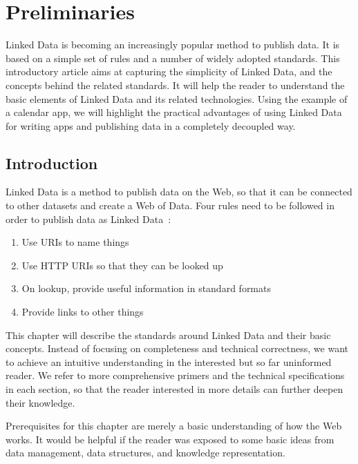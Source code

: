 \chapter{Preliminaries}

Linked Data is becoming an increasingly popular method to publish data.
It is based on a simple set of rules and a number of widely adopted standards.
This introductory article aims at capturing the simplicity of Linked Data, and the concepts behind the related standards.
It will help the reader to understand the basic elements of Linked Data and its related technologies.
Using the example of a calendar app, we will highlight the practical advantages of using Linked Data for writing apps and publishing data in a completely decoupled way.


\section{Introduction}
\label{intro}
Linked Data is a method to publish data on the Web, so that it can be connected to other datasets and create a Web of Data.
Four rules need to be followed in order to publish data as Linked Data~\cite{linkeddata-rules}:

\begin{enumerate}
\item Use URIs to name things
\item Use HTTP URIs so that they can be looked up
\item On lookup, provide useful information in standard formats
\item Provide links to other things
\end{enumerate}

This chapter will describe the standards around Linked Data and their basic concepts.
Instead of focusing on completeness and technical correctness, we want to achieve an intuitive understanding in the interested but so far uninformed reader.
We refer to more comprehensive primers and the technical specifications in each section, so that the reader interested in more details can further deepen their knowledge.

Prerequisites for this chapter are merely a basic understanding of how the Web works.
It would be helpful if the reader was exposed to some basic ideas from data management, data structures, and knowledge representation.

